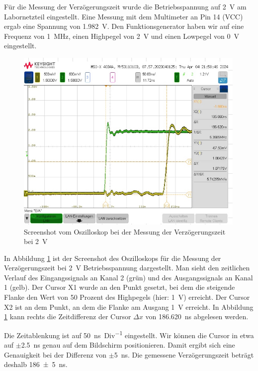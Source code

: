 \documentclass[paper=a4,oneside,abstract,DIV=19,parskip=half]{scrartcl}
\begin{document}
Für die Messung der Verzögerungszeit wurde die Betriebsspannung auf \SI{2}{\V} am Labornetzteil eingestellt. Eine Messung mit dem Multimeter an Pin 14 (VCC) ergab eine Spannung von \SI{1,982}{\V}. Den Funktionsgenerator haben wir auf eine Frequenz von \SI{1}{\MHz}, einen Highpegel von \SI{2}{\V} und einen Lowpegel von \SI{0}{\V} eingestellt.

\begin{figure}[!htb]
\begin{center}
\includegraphics[width=0.99\textwidth]{messung2v}
\end{center}
\caption{Screenshot vom Oszilloskop bei der Messung der Verzögerungszeit bei \SI{2}{\V}}
\label{fig:mess2v}
\end{figure}

In Abbildung \ref{fig:mess2v} ist der Screenshot des Oszilloskops für die Messung der Verzögerungszeit bei \SI{2}{\V} Betriebs\-spannung dargestellt. Man sieht den zeitlichen Verlauf des Eingangssignals an Kanal 2 (grün) und des Ausgangssignals an Kanal 1 (gelb). Der Cursor X1 wurde an den Punkt gesetzt, bei dem die steigende Flanke den Wert von 50 Prozent des Highpegels (hier: \SI{1}{\V}) erreicht. Der Cursor X2 ist an dem Punkt, an dem die Flanke am Ausgang \SI{1}{\V} erreicht. In Abbildung \ref{fig:mess2v} kann rechts die Zeitdifferenz der Cursor $\Delta x$ von \SI{186,620}{\ns} abgelesen werden.

Die Zeitablenkung ist auf \SI{50}{\ns\per Div} eingestellt. Wir können die Cursor in etwa auf $\pm$\SI{2,5}{\ns} genau auf dem Bildschirm positionieren. Damit ergibt sich eine Genauigkeit bei der Differenz von $\pm$\SI{5}{\ns}. Die gemessene Verzögerungszeit beträgt deshalb \SI{186(5)}{\ns}.
\end{document}
